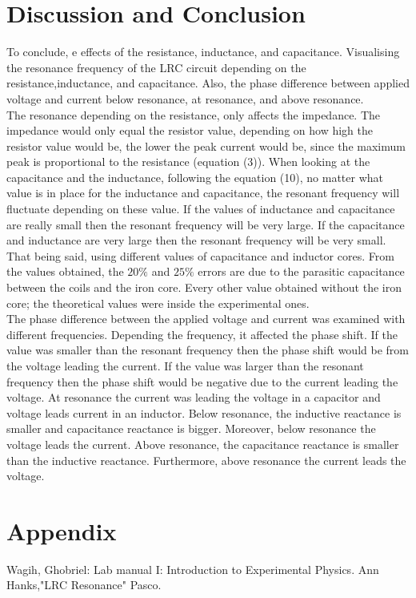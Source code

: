 \documentclass[11pt]{article}
\begin{document}
\section*{Discussion and Conclusion}
To conclude, e effects of the resistance,  inductance,  and capacitance. Visualising  the resonance frequency of the LRC circuit depending on the resistance,inductance, and capacitance. Also, the phase difference between applied voltage and current below resonance, at resonance, and above resonance.\\
The resonance depending on the resistance, only affects the impedance. The impedance would only equal the resistor value, depending on how high the resistor value would be, the lower the peak current would be, since the maximum peak is proportional to the resistance (equation (3)). When looking at the capacitance and the inductance, following the equation (10), no matter what value is in place for the inductance and capacitance, the resonant frequency will fluctuate depending on these value. If the values of inductance and capacitance are really small then the resonant frequency will be very large. If the capacitance and inductance are very large then the resonant frequency will be very small. That being said, using different values of capacitance and inductor cores. From the values obtained, the $20\%$ and $25\%$ errors are due to the parasitic capacitance between the coils and the iron core. Every other value obtained without the iron core; the theoretical values were inside the experimental ones. \\
The phase difference between the applied voltage and current was examined with different frequencies. Depending the frequency, it affected the phase shift. If the value was smaller than the resonant frequency then the phase shift would be from the voltage leading the current. If the value was larger than the resonant frequency then the phase shift would be negative due to the current leading the voltage. At resonance the current was leading the voltage in a capacitor and voltage leads current in an inductor. Below resonance, the inductive reactance is smaller and capacitance reactance is bigger. Moreover, below resonance the voltage leads the current. Above resonance, the capacitance reactance is smaller than the inductive reactance. Furthermore, above resonance the current leads the voltage. 
\newpage
\section*{Appendix}
Wagih, Ghobriel: Lab manual I: Introduction to Experimental Physics.
Ann Hanks,"LRC Resonance" Pasco.
\end{document}
